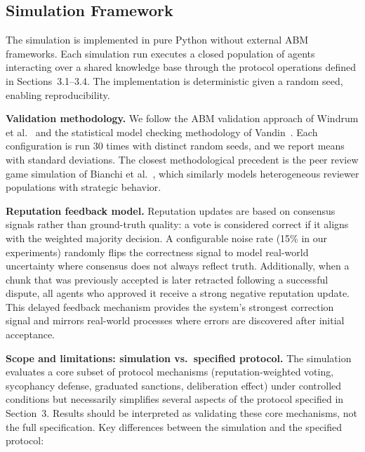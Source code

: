 \documentclass[11pt]{article}
\begin{document}
\subsection{Simulation Framework}

The simulation is implemented in pure Python without external ABM frameworks. Each simulation run executes a closed population of agents interacting over a shared knowledge base through the protocol operations defined in Sections~3.1--3.4. The implementation is deterministic given a random seed, enabling reproducibility.

\textbf{Validation methodology.} We follow the ABM validation approach of Windrum et al.~\cite{windrum2007} and the statistical model checking methodology of Vandin~\cite{vandin2024}. Each configuration is run 30 times with distinct random seeds, and we report means with standard deviations. The closest methodological precedent is the peer review game simulation of Bianchi et al.~\cite{bianchi2018}, which similarly models heterogeneous reviewer populations with strategic behavior.

\textbf{Reputation feedback model.} Reputation updates are based on consensus signals rather than ground-truth quality: a vote is considered correct if it aligns with the weighted majority decision. A configurable noise rate (15\% in our experiments) randomly flips the correctness signal to model real-world uncertainty where consensus does not always reflect truth. Additionally, when a chunk that was previously accepted is later retracted following a successful dispute, all agents who approved it receive a strong negative reputation update. This delayed feedback mechanism provides the system's strongest correction signal and mirrors real-world processes where errors are discovered after initial acceptance.

\textbf{Scope and limitations: simulation vs.\ specified protocol.} The simulation evaluates a core subset of protocol mechanisms (reputation-weighted voting, sycophancy defense, graduated sanctions, deliberation effect) under controlled conditions but necessarily simplifies several aspects of the protocol specified in Section~3. Results should be interpreted as validating these core mechanisms, not the full specification. Key differences between the simulation and the specified protocol:
\end{document}
